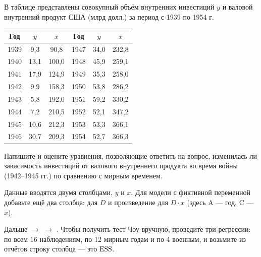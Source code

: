 
В таблице представлены совокупный объём внутренних инвестиций $y$ и валовой
внутренний продукт США (млрд долл.) за период с 1939 по 1954 г.

\begin{center}
\begin{tabular}{ccc @{\qquad} ccc}
\toprule
Год & $y$ & $x$ & Год & $y$ & $x$ \\
\midrule
1939 &  9,3 &  90,8 & 1947 & 34,0 & 232,8 \\
1940 & 13,1 & 100,0 & 1948 & 45,9 & 259,1 \\
1941 & 17,9 & 124,9 & 1949 & 35,3 & 258,0 \\
1942 &  9,9 & 158,3 & 1950 & 53,8 & 286,2 \\
1943 &  5,8 & 192,0 & 1951 & 59,2 & 330,2 \\
1944 &  7,2 & 210,5 & 1952 & 52,1 & 347,2 \\
1945 & 10,6 & 212,3 & 1953 & 53,3 & 366,1 \\
1946 & 30,7 & 209,3 & 1954 & 52,7 & 366,3 \\
\bottomrule
\end{tabular}
\end{center}

\noindent Напишите и оцените уравнения, позволяющие ответить на вопрос,
изменилась ли зависимость инвестиций от валового внутреннего продукта во время
войны (1942--1945 гг.) по сравнению с мирным временем.

\begin{excel}
Данные вводятся двумя столбцами, $y$ и $x$. Для модели с фиктивной переменной
добавьте ещё два столбца:  для $D$ и
произведение  для $D\cdot x$ (здесь A — год, C — $x$).

\smallskip
Дальше  $\to$  $\to$ . Чтобы
получить тест Чоу вручную, проведите три регрессии: по всем 16 наблюдениям, по
12 мирным годам и по 4 военным, и возьмите из отчётов строку
 столбца  — это $\mathrm{ESS}$.
\end{excel}

